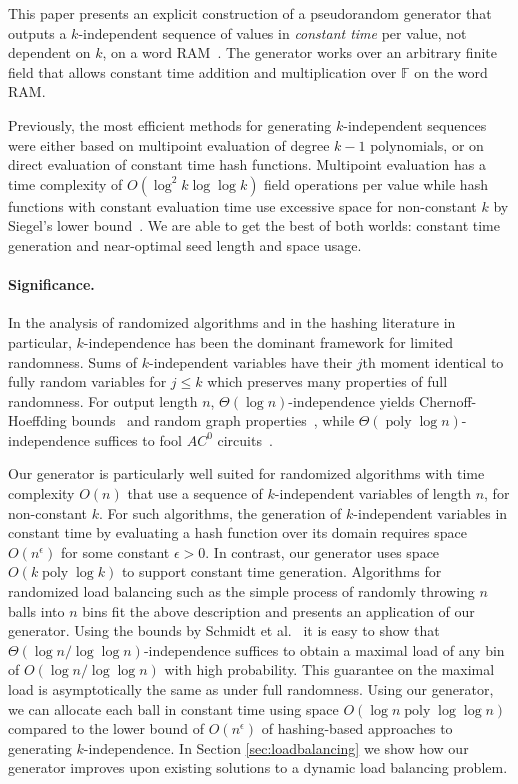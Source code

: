 \documentclass[a4paper,11pt]{article}
\theoremstyle{plain}
\theoremstyle{definition}
\newcommand{\F}{\mathbb{F}}
\DeclareMathOperator{\poly}{poly}
\begin{document}
This paper presents an explicit construction of a pseudorandom generator that outputs a $k$-independent sequence of values in \emph{constant time} per value, not dependent on $k$, on a word RAM~\cite{hagerup1998}. 
The generator works over an arbitrary finite field that allows constant time addition and multiplication over $\F$ on the word RAM.

Previously, the most efficient methods for generating $k$-independent sequences were either based on multipoint evaluation of degree $k-1$ polynomials, or on direct evaluation of constant time hash functions.
Multipoint evaluation has a time complexity of $O(\log^{2} k \log \log k)$ field operations per value while hash functions with constant evaluation time use excessive space for non-constant $k$ by Siegel's lower bound~\cite{siegel2004}.
We are able to get the best of both worlds: constant time generation and near-optimal seed length and space usage. 

\paragraph{Significance.}
In the analysis of randomized algorithms and in the hashing literature in particular, $k$-independence has been the dominant framework for limited randomness. 
Sums of $k$-independent variables have their $j$th moment identical to fully random variables for $j \leq k$ which preserves many properties of full randomness.
For output length $n$, $\Theta(\log n)$-independence yields Chernoff-Hoeffding bounds~\cite{schmidt1995} and random graph properties~\cite{alon2008},
while $\Theta(\poly \log n)$-independence suffices to fool $AC^{0}$ circuits~\cite{braverman2010}.

Our generator is particularly well suited for randomized algorithms with time complexity $O(n)$ that use a sequence of $k$-independent variables of length $n$, for non-constant $k$.
For such algorithms, the generation of $k$-independent variables in constant time by evaluating a hash function over its domain requires space $O(n^{\epsilon})$ for some constant $\epsilon > 0$. 
In contrast, our generator uses space $O(k \poly \log k)$ to support constant time generation. 
Algorithms for randomized load balancing such as the simple process of randomly throwing $n$ balls into $n$ bins fit the above description and presents an application of our generator.
Using the bounds by Schmidt et al.~\mbox{\cite[Theorem 2]{schmidt1995}} it is easy to show that $\Theta(\log n / \log \log n)$-independence suffices to obtain a maximal load of any bin of $O(\log n / \log \log n)$ with high probability.
This guarantee on the maximal load is asymptotically the same as under full randomness. 
Using our generator, we can allocate each ball in constant time using space $O(\log n \poly \log \log n)$ compared to the lower bound of $O(n^{\epsilon})$ of hashing-based approaches to generating $k$-independence. 
In Section \ref{sec:loadbalancing} we show how our generator improves upon existing solutions to a dynamic load balancing problem.
\end{document}
